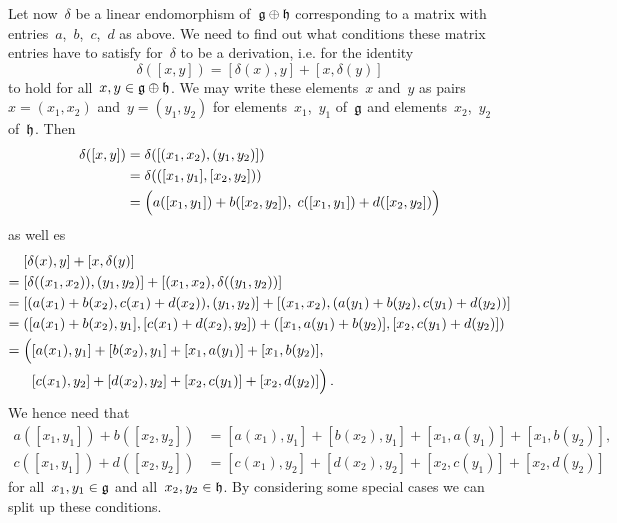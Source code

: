 \begin{example}
  Let now~$\delta$ be a linear endomorphism of~$\mathfrak{g} \oplus \mathfrak{h}$ corresponding to a matrix with entries~$a$,~$b$,~$c$,~$d$ as above.
  We need to find out what conditions these matrix entries have to satisfy for~$\delta$ to be a derivation, i.e. for the identity
  \begin{equation}
    \label{condition for derivation}
    \delta( [x,y] )
    =
    [ \delta(x), y ] + [ x, \delta(y) ]
  \end{equation}
  to hold for all~$x, y \in \mathfrak{g} \oplus \mathfrak{h}$.
  We may write these elements~$x$ and~$y$ as pairs~$x = (x_1, x_2)$ and~$y = (y_1, y_2)$ for elements~$x_1$,~$y_1$ of~$\mathfrak{g}$ and elements~$x_2$,~$y_2$ of~$\mathfrak{h}$.
  Then
  \begin{align*}
    \delta( [x, y] )
    &=
    \delta( [ (x_1, x_2), (y_1, y_2) ] )
    \\
    &=
    \delta( ( [x_1, y_1], [x_2, y_2] ) )
    \\
    &=
    \Bigl(
      a( [x_1, y_1] ) + b( [x_2, y_2] ) , \;
      c( [x_1, y_1] ) + d( [x_2, y_2] )
    \Bigr)
  \end{align*}
  as well es
  \begin{align*}
    {}&
    [ \delta(x), y ] + [ x, \delta(y) ]
    \\
    ={}&
    [ \delta( (x_1, x_2) ), (y_1, y_2) ]
    + [ (x_1, x_2), \delta( (y_1, y_2) ) ]
    \\
    ={}&
    [ ( a(x_1) + b(x_2), c(x_1) + d(x_2) ) , (y_1, y_2) ]
    + [ (x_1, x_2), ( a(y_1) + b(y_2), c(y_1) + d(y_2) ) ]
    \\
    ={}&
    ( [ a(x_1) + b(x_2), y_1 ], [ c(x_1) + d(x_2), y_2 ] )
    + ( [ x_1, a(y_1) + b(y_2) ] , [ x_2, c(y_1) + d(y_2) ] )
    \\
    ={}&
    \Bigl(
      [ a(x_1), y_1 ] + [ b(x_2), y_1 ] + [ x_1, a(y_1) ] + [ x_1, b(y_2) ] ,
    \\
    {}&
    \phantom{ \Bigl( }
      [ c(x_1), y_2 ] + [ d(x_2), y_2 ] + [ x_2, c(y_1) ] + [ x_2, d(y_2) ]
    \Bigr) \,.
  \end{align*}
  We hence need that
  \begin{align*}
    a( [x_1, y_1] ) + b( [x_2, y_2] )
    &=
    [ a(x_1), y_1 ] + [ b(x_2), y_1 ] + [ x_1, a(y_1) ] + [ x_1, b(y_2) ] , \\
    c( [x_1, y_1] ) + d( [x_2, y_2] )
    &=
    [ c(x_1), y_2 ] + [ d(x_2), y_2 ] + [ x_2, c(y_1) ] + [ x_2, d(y_2) ]
  \end{align*}
  for all~$x_1, y_1 \in \mathfrak{g}$ and all~$x_2, y_2 \in \mathfrak{h}$.
  By considering some special cases we can split up these conditions.

\end{example}

